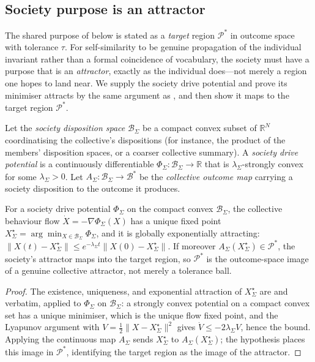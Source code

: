 \documentclass[11pt,twocolumn,a4paper]{article}
\newcommand{\R}{\mathbb{R}}
\newcommand{\Beh}{\mathcal{B}}       %
\newcommand{\Purp}{\mathcal{P}}      %
\newcommand{\Soc}{\Sigma}            %
\newcommand{\norm}[1]{\lVert#1\rVert}
\begin{document}
\subsection{Society purpose is an attractor}
\label{sec:socpurpose}

The shared purpose of  below is stated as a
\emph{target} region $\Purp^\ast$ in outcome space with tolerance $\tau$.
For self-similarity to be genuine propagation of the individual invariant
rather than a formal coincidence of vocabulary, the society must have a
purpose that is an \emph{attractor}, exactly as the individual does---not
merely a region one hopes to land near. We supply the society drive
potential and prove its minimiser attracts by the same argument as
, and then show it maps to the
target region $\Purp^\ast$.

\begin{definition}
\label{def:socdrive}
Let the \emph{society disposition space} $\Beh_\Soc$ be a compact convex
subset of $\R^N$ coordinatising the collective's dispositions (for
instance, the product of the members' disposition spaces, or a coarser
collective summary). A \emph{society drive potential} is a continuously
differentiable $\Phi_\Soc:\Beh_\Soc\to\R$ that is $\lambda_\Soc$-strongly
convex for some $\lambda_\Soc>0$. Let $A_\Soc:\Beh_\Soc\to\Beh^\ast$ be the
\emph{collective outcome map} carrying a society disposition to the
outcome it produces.
\end{definition}

\begin{theorem}
\label{thm:socattractor}
For a society drive potential $\Phi_\Soc$ on the compact convex
$\Beh_\Soc$, the collective behaviour flow $\dot X=-\nabla\Phi_\Soc(X)$ has
a unique fixed point $X^\star_\Soc=\arg\min_{X\in\Beh_\Soc}\Phi_\Soc$, and
it is globally exponentially attracting:
$\norm{X(t)-X^\star_\Soc}\le e^{-\lambda_\Soc t}\norm{X(0)-X^\star_\Soc}$.
If moreover $A_\Soc(X^\star_\Soc)\in\Purp^\ast$, the society's attractor
maps into the target region, so $\Purp^\ast$ is the outcome-space image of
a genuine collective attractor, not merely a tolerance ball.
\end{theorem}

\begin{proof}
The existence, uniqueness, and exponential attraction of $X^\star_\Soc$ are
 and  verbatim, applied to
$\Phi_\Soc$ on $\Beh_\Soc$: a strongly convex potential on a compact convex
set has a unique minimiser, which is the unique flow fixed point, and the
Lyapunov argument with $V=\tfrac12\norm{X-X^\star_\Soc}^2$ gives
$\dot V\le-2\lambda_\Soc V$, hence the bound. Applying the continuous map
$A_\Soc$ sends $X^\star_\Soc$ to $A_\Soc(X^\star_\Soc)$; the hypothesis
places this image in $\Purp^\ast$, identifying the target region as the
image of the attractor.
\end{proof}
\end{document}
